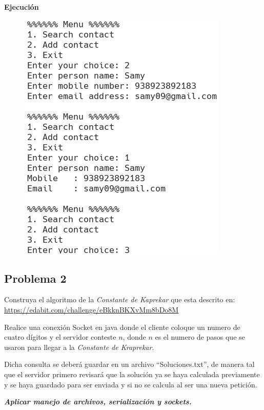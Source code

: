 \documentclass[11pt, twocolumn]{article}
\begin{document}
  \textbf{Ejecución}
  \begin{figure}[h!]
    \centering
    \includegraphics[width=0.6\columnwidth]{P1.png}
  \end{figure}

  \subsection*{Problema 2}
  Construya el algoritmo de la \textit{Constante de Kaprekar} que esta descrito en: \url{https://edabit.com/challenge/eBkknBKXvMm8bDo8M} 

  Realice una conexión Socket en java donde el cliente coloque un numero de cuatro dígitos y el servidor conteste $n$, donde $n$ es el numero de pasos que se usaron para llegar a la \textit{Constante de Kraprekar}.

  Dicha consulta se deberá guardar en un archivo ``Soluciones.txt'', de manera tal que el servidor primero revisará que la solución ya se haya calculada previamente y se haya guardado para ser enviada y si no se calcula al ser una nueva petición.

  \textit{\textbf{Aplicar manejo de archivos, serialización y sockets.}}
\end{document}
